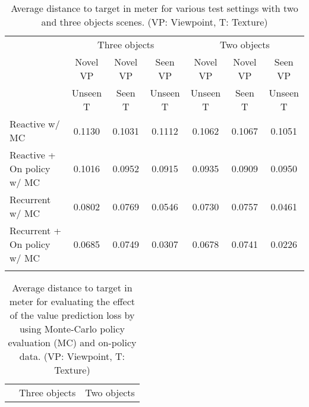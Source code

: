 \documentclass[10pt,twocolumn,letterpaper]{article}
\begin{document}
\begin{table*}
\begin{small}
\begin{center}
\caption{\small Average distance to target in meter for various test settings with two and three objects scenes. (VP: Viewpoint, T: Texture) \vspace{-.01in} \label{tab:sim_exp_avg}}
\renewcommand*{\arraystretch}{0.9}
\begin{tabular}[10pt]{lcccccc}
\toprule
  \multirow{3}{*}{}& \multicolumn{3}{c}{Three objects} & \multicolumn{3}{c}{Two objects} \\\cline{2-7}
 
 &{Novel VP} & {Novel VP} & {Seen VP} &{Novel VP} & {Novel VP} & {Seen VP} \\
  & {Unseen T} & {Seen T } & {Unseen T } & {Unseen T} & {Seen T } & {Unseen T } \\
\midrule{Reactive w/ MC}             & {0.1130} & {0.1031} & {0.1112} & {0.1062} & {0.1067} & {0.1051}  \\
{Reactive + On policy w/ MC} & {0.1016} & {0.0952} & {0.0915} & {0.0935} & {0.0909} & {0.0950}  \\
{Recurrent w/ MC}            & {0.0802} & {0.0769} & {0.0546} & {0.0730} & {0.0757} & {0.0461}  \\
{Recurrent + On policy w/ MC}  & {0.0685} & {0.0749} & {0.0307} & {0.0678}  & {0.0741} & {0.0226} \\
\bottomrule
\vspace{-.25in}
\end{tabular}
\end{center}
\end{small}
\end{table*}\begin{table*}
\begin{small}
\begin{center}
\caption{\small Average distance to target in meter for evaluating the effect of the value prediction loss by using Monte-Carlo policy evaluation (MC) and on-policy data. (VP: Viewpoint, T: Texture) \vspace{-.01in} \label{tab:sim_MC_onP_ablation}}
\renewcommand*{\arraystretch}{0.9}
\begin{tabular}[10pt]{lcccccc}
\toprule
  \multirow{3}{*}{}& \multicolumn{3}{c}{Three objects} & \multicolumn{3}{c}{Two objects} \\\cline{2-7}
 

\end{tabular}
\end{center}
\end{small}
\end{table*}
\end{document}
